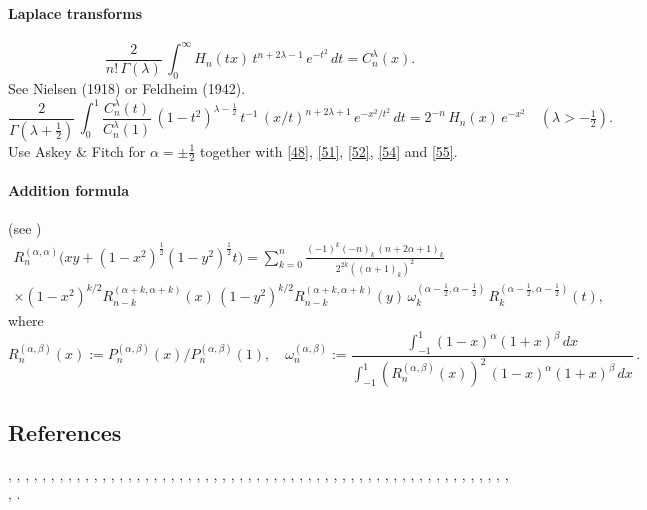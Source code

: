 \documentclass[envcountchap,graybox]{svmono}
\renewcommand{\Gamma}{\varGamma}
\newcommand\al\alpha
\newcommand\be\beta
\newcommand\la\lambda
\newcommand\om\omega
\newcommand\Ga{\Gamma}
\newcommand\half{\frac12}
\newcommand\thalf{\tfrac12}
\newcommand\iy\infty
\begin{document}
\paragraph{Laplace transforms}
\begin{equation}
\frac2{n!\,\Ga(\la)}\,
\int_0^\iy H_n(tx)\,t^{n+2\la-1}\,e^{-t^2}\,dt=C_n^\la(x).
\label{56}
\end{equation}
See Nielsen \cite[p.48, (4) with p.47, (1) and p.28, (10)]{K4} (1918)
or Feldheim \cite[(28)]{K3} (1942).
\begin{equation}
\frac2{\Ga(\la+\thalf)}\,\int_0^1 \frac{C_n^\la(t)}{C_n^\la(1)}\,
(1-t^2)^{\la-\half}\,t^{-1}\,(x/t)^{n+2\la+1}\,e^{-x^2/t^2}\,dt
=2^{-n}\,H_n(x)\,e^{-x^2}\quad(\la>-\thalf).
\label{46}
\end{equation}
Use Askey \& Fitch \cite[(3.29)]{K2} for $\al=\pm\thalf$ together with
\eqref{48}, \eqref{51}, \eqref{52}, \eqref{54} and \eqref{55}.
\paragraph{Addition formula} (see \mycite{AAR}{(9.8.5$'$)]})
\begin{multline}
R_n^{(\al,\al)}\big(xy+(1-x^2)^\half(1-y^2)^\half t\big)
=\sum_{k=0}^n \frac{(-1)^k(-n)_k\,(n+2\al+1)_k}{2^{2k}((\al+1)_k)^2}\\
\times(1-x^2)^{k/2} R_{n-k}^{(\al+k,\al+k)}(x)\,(1-y^2)^{k/2} R_{n-k}^{(\al+k,\al+k)}(y)\,
\om_k^{(\al-\half,\al-\half)}\,R_k^{(\al-\half,\al-\half)}(t),
\label{108}
\end{multline}
where
\[
R_n^{(\al,\be)}(x):=P_n^{(\al,\be)}(x)/P_n^{(\al,\be)}(1),\quad
\om_n^{(\al,\be)}:=\frac{\int_{-1}^1 (1-x)^\al(1+x)^\be\,dx}
{\int_{-1}^1 (R_n^{(\al,\be)}(x))^2\,(1-x)^\al(1+x)^\be\,dx}\,.
\]
%

\subsection*{References}
\cite{Abram}, \cite{Ahmed+86}, \cite{AndrewsAskeyRoy}, \cite{Area+I}, \cite{Askey67}, \cite{Askey74}, \cite{Askey75},
\cite{Askey89I}, \cite{AskeyFitch}, \cite{AskeyKoornRahman}, \cite{Berg}, \cite{BilodeauI},
\cite{BojanovNikolov}, \cite{Brafman51}, \cite{Brafman57I}, \cite{Brown},
\cite{BustozIsmail82}, \cite{BustozIsmail83}, \cite{BustozIsmail89}, \cite{BustozSavage79},
\cite{BustozSavage80}, \cite{Carlitz61II}, \cite{Chihara78}, \cite{Common}, \cite{Danese},
\cite{Dette94}, \cite{DijksmaKoorn}, \cite{DilcherStolarsky}, \cite{Dimitrov96},
\cite{Dimitrov2003}, \cite{Doha2002II}, \cite{Driver}, \cite{ElbertLaforgia86I},
\cite{ElbertLaforgia86II}, \cite{ElbertLaforgia90}, \cite{Erdelyi+}, \cite{Exton96},
\cite{Gasper69}, \cite{Gasper72II}, \cite{Gasper85}, \cite{Grad}, \cite{Ismail74},
\cite{Ismail2005II}, \cite{Koekoek2000}, \cite{Koorn88}, \cite{Laforgia}, \cite{LewanowiczI},
\cite{Lorch}, \cite{Mathai}, \cite{Nagel}, \cite{Nikiforov+}, \cite{NikiforovUvarov},
\cite{RahmanShah}, \cite{Rainville}, \cite{Reimer}, \cite{Sartoretto}, \cite{Srivastava71},
\cite{Szego75}, \cite{Temme}, \cite{Viswanathan}, \cite{Zayed}.
\end{document}
